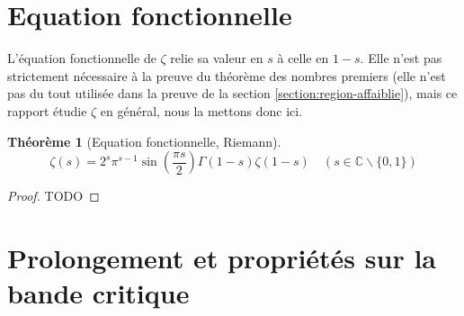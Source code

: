 \documentclass[french]{report}
\newtheorem{theorem}{Théorème}[section]
\begin{document}

\section{Equation fonctionnelle}

L'équation fonctionnelle de $\zeta$ relie sa valeur en $s$ à celle en $1-s$. Elle n'est pas strictement nécessaire à la preuve du théorème des nombres premiers (elle n'est pas du tout utilisée dans la preuve de la section \ref{section:region-affaiblie}), mais ce rapport étudie $\zeta$ en général, nous la mettons donc ici.

\begin{theorem}[Equation fonctionnelle, Riemann]\label{thm:equation-fonctionnelle}
  \[ \zeta(s) = 2^s\pi^{s-1}\sin\left(\frac{\pi s}{2}\right)\Gamma(1-s)\zeta(1-s)\quad (s\in\mathbb{C}\backslash\{0,1\}) \]
\end{theorem}

\begin{proof}
  TODO
\end{proof}

\section{Prolongement et propriétés sur la bande critique}\label{section:prolongement-proprietes-bande-critique}
\end{document}
